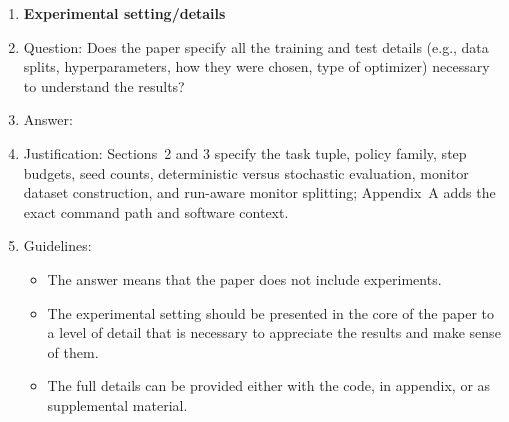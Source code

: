 \documentclass{article}
\begin{document}
\begin{enumerate}
\item {\bf Experimental setting/details}
    \item[] Question: Does the paper specify all the training and test details (e.g., data splits, hyperparameters, how they were chosen, type of optimizer) necessary to understand the results?
    \item[] Answer: \answerYes{}
    \item[] Justification: Sections~2 and 3 specify the task tuple, policy family, step budgets, seed counts, deterministic versus stochastic evaluation, monitor dataset construction, and run-aware monitor splitting; Appendix~A adds the exact command path and software context.
    \item[] Guidelines:
    \begin{itemize}
        \item The answer \answerNA{} means that the paper does not include experiments.
        \item The experimental setting should be presented in the core of the paper to a level of detail that is necessary to appreciate the results and make sense of them.
        \item The full details can be provided either with the code, in appendix, or as supplemental material.
    \end{itemize}


\end{enumerate}
\end{document}
